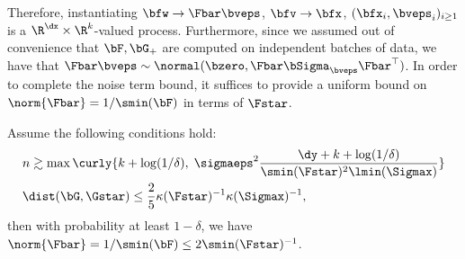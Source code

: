 Therefore, instantiating $\bfw \to \Fbar \bveps$, $\bfv \to \bfx$, $(\bfx_i, \bveps_i)_{i \geq 1}$ is a $\R^{\dx} \times \R^k$-valued process. Furthermore, since we assumed out of convenience that $\bF, \bG_+$ are computed on independent batches of data, we have that $\Fbar \bveps \sim \normal(\bzero, \Fbar \bSigma_{\bveps} \Fbar^{\top})$. In order to complete the noise term bound, it suffices to provide a uniform bound on $\norm{\Fbar} = 1/\smin(\bF)$ in terms of $\Fstar$.
\begin{lemma}\label{lem:F_close_to_Fstar}
    Assume the following conditions hold:
    \begin{align*}
        &n \gtrsim \max\curly{k + \log(1/\delta),\; \sigmaeps^2 \frac{\dy + k + \log(1/\delta)}{\smin(\Fstar)^2\lmin(\Sigmax)}} \\
        &\dist(\bG, \Gstar) \leq \frac{2}{5} \kappa(\Fstar)^{-1} \kappa(\Sigmax)^{-1},
    \end{align*}
    then with probability at least $1 - \delta$, we have $\norm{\Fbar} = 1/\smin(\bF) \leq 2 \smin(\Fstar)^{-1}$.
\end{lemma}
